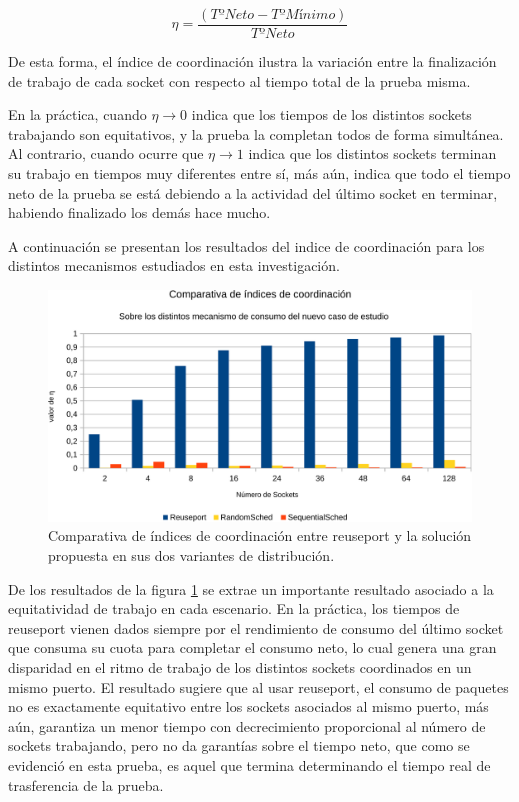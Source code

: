 \begin{equation}
\eta = \frac{\left(Tº Neto - Tº Mínimo\right)}{Tº Neto}
\end{equation}

De esta forma, el índice de coordinación ilustra la variación entre la finalización de trabajo de cada socket con respecto al tiempo total de la prueba misma. 

En la práctica, cuando $\eta\rightarrow 0$ indica que los tiempos de los distintos sockets trabajando son equitativos, y la prueba la completan todos de forma simultánea. Al contrario, cuando ocurre que $\eta \rightarrow 1$ indica que los distintos sockets terminan su trabajo en tiempos muy diferentes entre sí, más aún, indica que todo el tiempo neto de la prueba se está debiendo a la actividad del último socket en terminar, habiendo finalizado los demás hace mucho.

A continuación se presentan los resultados del indice de coordinación para los distintos mecanismos estudiados en esta investigación.

\begin{figure}[!h]
	\centering
	\includegraphics[scale=.6]{resultados/tiempodelta-crop.pdf}
	\caption{Comparativa de índices de coordinación entre reuseport y la solución propuesta en sus dos variantes de distribución.}
	\label{fig:tiemposdelta}
\end{figure}

De los resultados de la figura \ref{fig:tiemposdelta} se extrae un importante resultado asociado a la equitatividad de trabajo en cada escenario. En la práctica, los tiempos de reuseport vienen dados siempre por el rendimiento de consumo del último socket que consuma su cuota para completar el consumo neto, lo cual genera una gran disparidad en el ritmo de trabajo de los distintos sockets coordinados en un mismo puerto. El resultado sugiere que al usar reuseport, el consumo de paquetes no es exactamente equitativo entre los sockets asociados al mismo puerto, más aún, garantiza un menor tiempo con decrecimiento proporcional al número de sockets trabajando, pero no da garantías sobre el tiempo neto, que como se evidenció en esta prueba, es aquel que termina determinando el tiempo real de trasferencia de la prueba.

